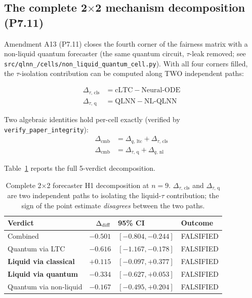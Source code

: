 \subsection{The complete 2$\times$2 mechanism decomposition (P7.11)}
\label{sec:forecaster-2x2}

Amendment A13 (P7.11) closes the fourth corner of the fairness
matrix with a non-liquid quantum forecaster (the same quantum
circuit, $\tau$-leak removed; see
\texttt{src/qlnn\_/cells/non\_liquid\_quantum\_cell.py}). With all
four corners filled, the $\tau$-isolation contribution can be
computed along TWO independent paths:

\begin{align*}
\Delta_{\tau,\,\text{cls}}
  &= \text{cLTC} - \text{Neural-ODE} \\
\Delta_{\tau,\,\text{q}}
  &= \mathrm{QLNN} - \text{NL-QLNN}
\end{align*}

Two algebraic identities hold per-cell exactly (verified by
\texttt{verify\_paper\_integrity}):
\begin{align*}
\Delta_\mathrm{cmb} &= \Delta_{q,\,\text{ltc}} + \Delta_{\tau,\,\text{cls}} \\
\Delta_\mathrm{cmb} &= \Delta_{\tau,\,\text{q}} + \Delta_{q,\,\text{nl}}
\end{align*}

Table~\ref{tab:forecaster-2x2} reports the full 5-verdict
decomposition.

\begin{table}[h]
\centering
\caption{Complete 2$\times$2 forecaster H1 decomposition at $n=9$.
$\Delta_{\tau,\,\text{cls}}$ and
$\Delta_{\tau,\,\text{q}}$ are two independent paths to
isolating the liquid-$\tau$ contribution; the sign of the point
estimate \emph{disagrees} between the two paths.}
\label{tab:forecaster-2x2}
\small
\begin{tabular}{lrll}
\toprule
Verdict & $\Delta_{\mathrm{diff}}$ & 95\% CI & Outcome \\
\midrule
Combined & $-0.501$ & $[-0.804, -0.244]$ & FALSIFIED \\
Quantum via LTC          & $-0.616$ & $[-1.167, -0.178]$ & FALSIFIED \\
\textbf{Liquid via classical} & $\mathbf{+0.115}$ & $\mathbf{[-0.097, +0.377]}$ &
  FALSIFIED \\
\textbf{Liquid via quantum}   & $\mathbf{-0.334}$ & $\mathbf{[-0.627, +0.053]}$ &
  FALSIFIED \\
Quantum via non-liquid    & $-0.167$ & $[-0.495, +0.204]$ & FALSIFIED \\
\bottomrule
\end{tabular}
\end{table}


